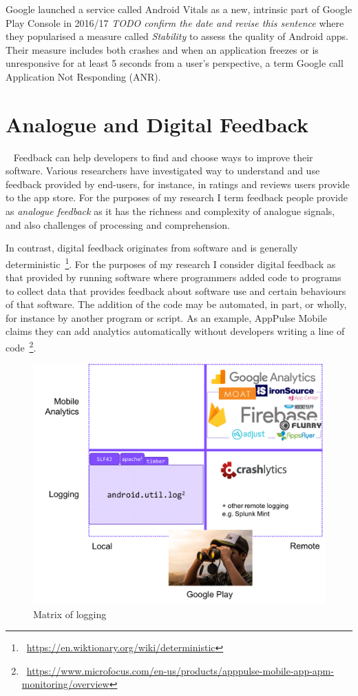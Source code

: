 Google launched a service called Android Vitals as a new, intrinsic part of Google Play Console in 2016/17 \emph{TODO confirm the date and revise this sentence} where they popularised a measure called \emph{Stability} to assess the quality of Android apps. Their measure includes both crashes and when an application freezes or is unresponsive for at least 5 seconds from a user's perspective, a term Google call Application Not Responding (ANR).

\section{Analogue and Digital Feedback}~\label{analogue-and-digital-feedback}
Feedback can help developers to find and choose ways to improve their software. Various researchers have investigated way to understand and use feedback provided by end-users, for instance, in ratings and reviews users provide to the app store. For the purposes of my research I term feedback people provide as \emph{analogue feedback} as it has the richness and complexity of analogue signals, and also challenges of processing and comprehension.

In contrast, digital feedback originates from software and is generally deterministic~\footnote{~\url{https://en.wiktionary.org/wiki/deterministic}}. For the purposes of my research I consider digital feedback as that provided by running software where programmers added code to programs to collect data that provides feedback about software use and certain behaviours of that software. The addition of the code may be automated, in part, or wholly, for instance by another program or script. As an example, AppPulse Mobile claims they can add analytics automatically without developers writing a line of code~\footnote{~\url{https://www.microfocus.com/en-us/products/apppulse-mobile-app-apm-monitoring/overview}}.

\begin{figure}[ht]
    \centering
    \includegraphics[width=12cm]{images/matrix-of-logging.png}
    \caption{Matrix of logging}
    \label{fig:matrix-of-logging}
\end{figure}

